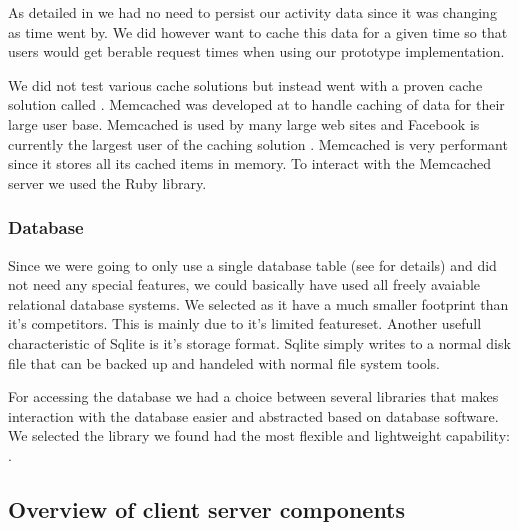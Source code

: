 As detailed in  we had no need
to persist our activity data since it was changing as time went by. We did
however want to cache this data for a given time so that users would get
berable request times when using our prototype implementation.

We did not test various cache solutions but instead went with a proven
cache solution called .%
Memcached was developed at %
to handle caching of data for their large user base. Memcached is used by many
large web sites and Facebook is currently the largest user of the
caching solution \citep{facebook08b}. Memcached is very performant since it
stores all its cached items in memory. To interact with the Memcached server
we used the %
Ruby library.

\subsubsection{Database}

Since we were going to only use a single database table
(see  for details)
and did not need any special features, we could
basically have used all freely avaiable relational database systems. We
selected %
as it have a much smaller footprint than it's
competitors. This is mainly due to it's limited featureset. Another usefull
characteristic of Sqlite is it's storage format. Sqlite simply writes to a
normal disk file that can be backed up and handeled with normal
file system tools.

For accessing the database we had a choice between several libraries that
makes interaction with the database easier and abstracted based on database
software.
We selected the library we found had the most flexible and lightweight
 capability: .%

\subsection{Overview of client \oldand server components}

